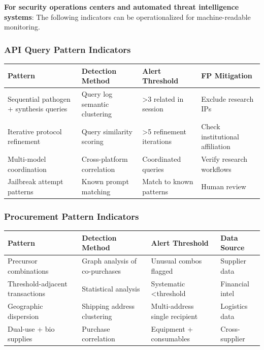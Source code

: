 \documentclass[11pt,letterpaper]{article}
\begin{document}
\textbf{For security operations centers and automated threat intelligence systems}: The following indicators can be operationalized for machine-readable monitoring.

\subsubsection*{API Query Pattern Indicators}

\begin{center}
\small
\begin{tabular}{L{3.5cm}L{3.5cm}L{2.5cm}L{2.5cm}}
\toprule
\textbf{Pattern} & \textbf{Detection Method} & \textbf{Alert Threshold} & \textbf{FP Mitigation} \\
\midrule
Sequential pathogen + synthesis queries & Query log semantic clustering & >3 related in session & Exclude research IPs \\
Iterative protocol refinement & Query similarity scoring & >5 refinement iterations & Check institutional affiliation \\
Multi-model coordination & Cross-platform correlation & Coordinated queries & Verify research workflows \\
Jailbreak attempt patterns & Known prompt matching & Match to known patterns & Human review \\
\bottomrule
\end{tabular}
\end{center}

\subsubsection*{Procurement Pattern Indicators}

\begin{center}
\small
\begin{tabular}{L{3.5cm}L{3.5cm}L{3cm}L{2cm}}
\toprule
\textbf{Pattern} & \textbf{Detection Method} & \textbf{Alert Threshold} & \textbf{Data Source} \\
\midrule
Precursor combinations & Graph analysis of co-purchases & Unusual combos flagged & Supplier data \\
Threshold-adjacent transactions & Statistical analysis & Systematic <threshold & Financial intel \\
Geographic dispersion & Shipping address clustering & Multi-address single recipient & Logistics data \\
Dual-use + bio supplies & Purchase correlation & Equipment + consumables & Cross-supplier \\
\bottomrule
\end{tabular}
\end{center}
\end{document}
